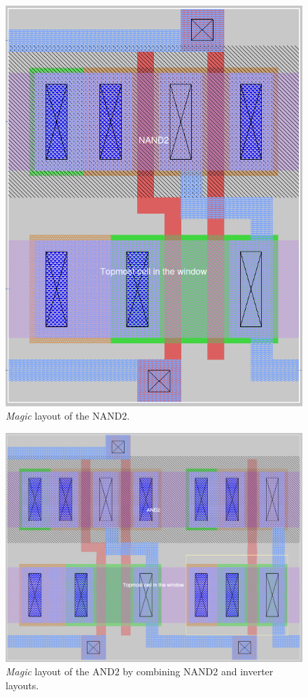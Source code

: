\documentclass[11pt]{article}
\begin{document}
    \begin{figure}[!ht]
        \centering
        \includegraphics[width=0.8\linewidth]{nand2_mag.png}
        \caption{\textit{Magic} layout of the NAND2.}
        \label{fig:nand2mag}
    \end{figure}
    \begin{figure}[!ht]
        \centering
        \includegraphics[width=\linewidth]{and2mag.png}
        \caption{\textit{Magic} layout of the AND2 by combining NAND2 and inverter layouts.}
        \label{fig:and2mag}
    \end{figure}
\end{document}
